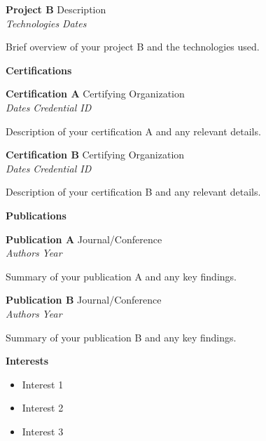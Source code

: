 \documentclass[11pt,a4paper]{article}
\newcommand{\sectionheading}[1]{\vspace{8pt}\noindent\textbf{\textcolor{myblue}{\large #1}}}
\newcommand{\entry}[4]{
  \noindent \textbf{#1} \hfill #2 \\
  \textit{#3} \hfill \textit{#4} \\
  \vspace{4pt}
}
\begin{document}
\entry{Project B}{Description}{Technologies}{Dates}
Brief overview of your project B and the technologies used.

\vspace{8pt}

\sectionheading{\textcolor{myblue}{Certifications}}
\newline
\entry{Certification A}{Certifying Organization}{Dates}{Credential ID}
Description of your certification A and any relevant details.

\entry{Certification B}{Certifying Organization}{Dates}{Credential ID}
Description of your certification B and any relevant details.

\vspace{8pt}

\sectionheading{\textcolor{myblue}{Publications}}
\newline
\entry{Publication A}{Journal/Conference}{Authors}{Year}
Summary of your publication A and any key findings.

\entry{Publication B}{Journal/Conference}{Authors}{Year}
Summary of your publication B and any key findings.

\vspace{8pt}

\sectionheading{\textcolor{myblue}{Interests}}
\begin{itemize}
  \item Interest 1
  \item Interest 2
  \item Interest 3
\end{itemize}
\end{document}

